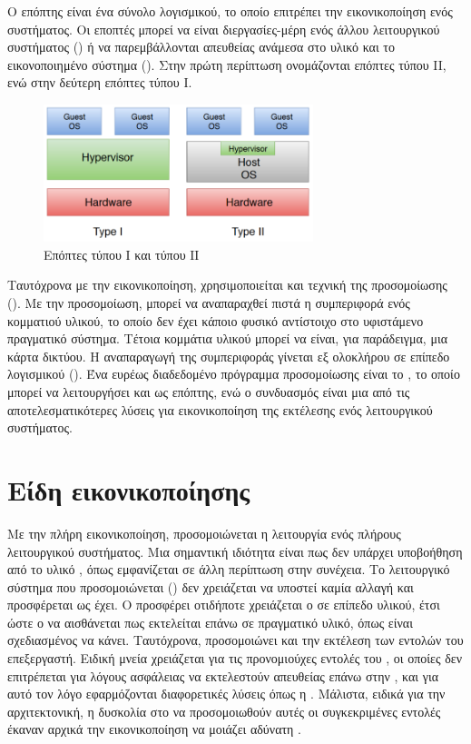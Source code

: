 Ο επόπτης είναι ένα σύνολο λογισμικού, το οποίο επιτρέπει την
εικονικοποίηση ενός συστήματος. Οι εποπτές μπορεί να είναι διεργασίες-μέρη ενός άλλου λειτουργικού συστήματος ()
ή να παρεμβάλλονται απευθείας ανάμεσα στο υλικό και το εικονοποιημένο σύστημα
(). Στην πρώτη περίπτωση ονομάζονται επόπτες τύπου II, ενώ στην δεύτερη
επόπτες τύπου I\cite{Aimilios}.
\newline
\begin{figure}[h]
  \includegraphics[width=0.7\textwidth]{pictures/typeI-II-hypervisors.PNG}
  \caption{Επόπτες τύπου I και τύπου ΙΙ}
  \label{fig:typeI-II}
\end{figure}


Ταυτόχρονα με την εικονικοποίηση, χρησιμοποιείται και τεχνική της προσομοίωσης
(). Με την προσομοίωση, μπορεί να αναπαραχθεί πιστά η συμπεριφορά ενός
κομματιού υλικού, το οποίο δεν έχει κάποιο φυσικό αντίστοιχο στο υφιστάμενο πραγματικό
σύστημα. Τέτοια κομμάτια υλικού μπορεί να είναι, για παράδειγμα, μια κάρτα δικτύου. Η
αναπαραγωγή της συμπεριφοράς γίνεται εξ ολοκλήρου σε επίπεδο λογισμικού
(). Ένα ευρέως διαδεδομένο πρόγραμμα προσομοίωσης είναι
το ,
το οποίο μπορεί να λειτουργήσει και ως επόπτης, ενώ ο συνδυασμός 
 είναι
μια από τις αποτελεσματικότερες λύσεις για εικονικοποίηση της εκτέλεσης ενός
λειτουργικού συστήματος\cite{QemuWiki}.

\section{Είδη εικονικοποίησης}

Με την πλήρη εικονικοποίηση, προσομοιώνεται η λειτουργία ενός πλήρους λειτουργικού
συστήματος. Μια σημαντική ιδιότητα είναι πως δεν υπάρχει υποβοήθηση από το
υλικό , όπως εμφανίζεται σε άλλη περίπτωση στην συνέχεια.
Το λειτουργικό σύστημα που προσομοιώνεται () δεν χρειάζεται να υποστεί
καμία αλλαγή και προσφέρεται ως έχει. Ο  προσφέρει οτιδήποτε
χρειάζεται ο  σε επίπεδο υλικού, έτσι ώστε ο  να αισθάνεται πως
εκτελείται επάνω σε πραγματικό υλικό, όπως είναι σχεδιασμένος να κάνει.
Ταυτόχρονα, προσομοιώνει και την εκτέλεση των εντολών του επεξεργαστή.
Ειδική μνεία χρειάζεται για τις προνομιούχες εντολές του , οι οποίες
δεν επιτρέπεται για λόγους ασφάλειας να εκτελεστούν απευθείας επάνω στην
, και για αυτό τον λόγο εφαρμόζονται διαφορετικές λύσεις όπως η . Μάλιστα, ειδικά για την  αρχιτεκτονική, η δυσκολία στο να
προσομοιωθούν αυτές οι συγκεκριμένες εντολές έκαναν αρχικά την εικονικοποίηση να μοιάζει
αδύνατη \cite{VMwarePaper}.
\newline

